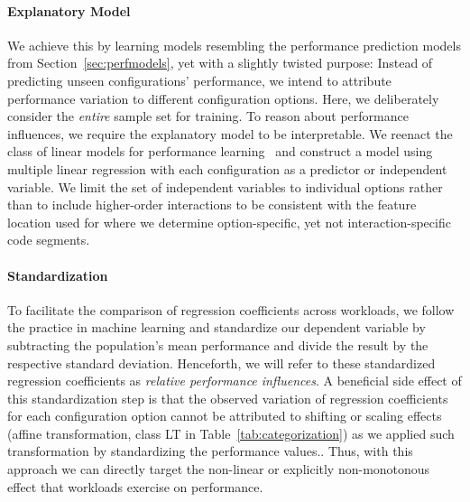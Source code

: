 {\paragraph*{Explanatory Model}
We achieve this by learning models resembling the performance prediction models from Section~\ref{sec:perfmodels}, yet with a slightly twisted purpose: Instead of predicting unseen configurations’ performance, we intend to attribute performance variation to different configuration options. Here, we deliberately consider the \textit{entire} sample set for training. 
To reason about performance influences, we require the explanatory model to be interpretable. We reenact the class of linear models for performance learning~\cite{dorn2020,siegmundPerformanceinfluenceModelsHighly2015,perLasso} and construct a model using multiple linear regression with each configuration as a predictor or independent variable. We limit the set of independent variables to individual options rather than to include higher-order interactions to be consistent with the feature location used for  where we determine option-specific, yet not interaction-specific code segments.

\paragraph*{Standardization}
To facilitate the comparison of regression coefficients across workloads, we follow the practice in machine learning and standardize our dependent variable by subtracting the population’s mean performance and divide the result by the respective standard deviation. Henceforth, we will refer to these standardized regression coefficients as \textit{relative performance influences}. A beneficial side effect of this standardization step is that the observed variation of regression coefficients for each configuration option cannot be attributed to shifting or scaling effects (affine transformation, class \colorbox{lt-color}{\textsf{LT}} in Table~\ref{tab:categorization}) as we applied such transformation by standardizing the performance values.. Thus, with this approach we can directly target the non-linear or explicitly non-monotonous effect that workloads exercise on performance.

}
